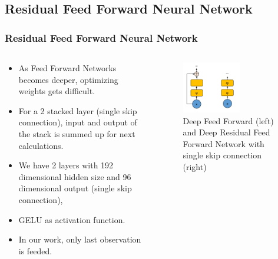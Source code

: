 \documentclass{beamer}
\begin{document}
\subsection{Residual Feed Forward Neural Network}

\begin{frame}
\frametitle{Residual Feed Forward Neural Network}
\begin{columns}[onlytextwidth]
	\begin{column}{.49\textwidth}
		\begin{itemize}
			\item As Feed Forward Networks becomes deeper, optimizing weights gets difficult. 
			\item For a 2 stacked layer (single skip connection), input and output of the stack is summed up for next calculations. 
			\item We have 2 layers with 192 dimensional hidden size and 96 dimensional output (single skip connection), 
			\item GELU as activation function.
			\item In our work, only last observation is feeded. 
		\end{itemize}
	\end{column}
	\begin{column}{.49\textwidth}
		\begin{figure}
			\centering
			\includegraphics[width=0.6\textwidth]{figures/ml_theory/rffnn_vs_ffnn.png}
			\caption{Deep Feed Forward (left) and Deep Residual Feed Forward Network with single skip connection (right)}
			\label{fig:rffnn_ffnn}
		\end{figure}
	\end{column}
\end{columns}
\end{frame}

\end{document}
